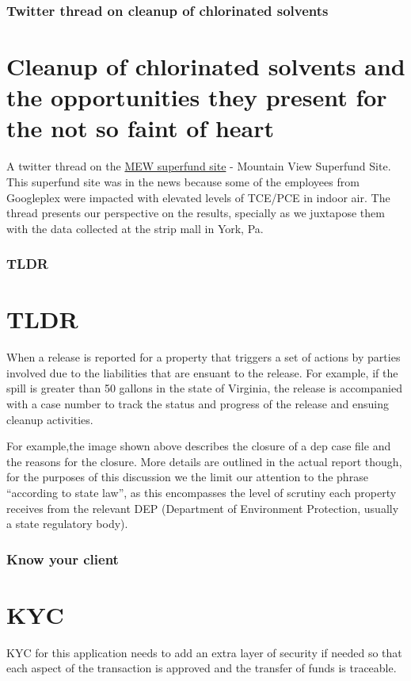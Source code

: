 \documentclass{beamer}
\newcommand{\quotes}[1]{``#1''}
\begin{document}
\begin{frame}
\frametitle{Twitter thread on cleanup of chlorinated solvents}

\section{Cleanup of chlorinated solvents and the opportunities they present for the not so faint of heart}

A twitter thread on the \href{https://twitter.com/dganti1/status/1254433456462979078}{MEW superfund site} - Mountain View Superfund Site. This superfund site was in the news because some of the employees from Googleplex were impacted with elevated levels of TCE/PCE in indoor air. The thread presents our perspective on the results, specially as we juxtapose them with the data collected at the strip mall in York, Pa.

\end{frame}

\begin{frame}
\frametitle{TLDR}
\section{TLDR}
  When a release is reported for a property that triggers a set of actions by parties involved due to the liabilities that are ensuant to the release. For example, if the spill is greater than 50 gallons in the state of Virginia, the release is accompanied with a case number to track the status and progress of the release and ensuing cleanup activities.

  For example,the image shown above describes the closure of a dep case file and the reasons for the closure. More details are outlined in the actual report though, for the purposes of this discussion we the limit our attention to the phrase \quotes{according to state law}, as this encompasses the level of scrutiny each property receives from the relevant DEP (Department of Environment Protection, usually a state regulatory body). 

\end{frame}

\begin{frame}
\frametitle{Know your client}
\section {KYC}
KYC for this application needs to add an extra layer of security if needed so that each aspect of the transaction is approved and the transfer of funds is traceable.
\end{frame}
\end{document}
